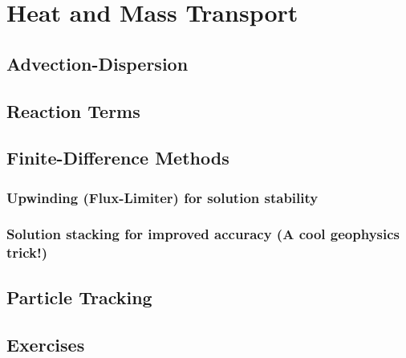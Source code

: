 \section{Heat and Mass Transport}
\subsection{Advection-Dispersion}
\subsection{Reaction Terms}
\subsection{Finite-Difference Methods}
\subsubsection{Upwinding (Flux-Limiter) for solution stability}
\subsubsection{Solution stacking for improved accuracy (A cool geophysics trick!)}
\subsection{Particle Tracking}
\subsection{Exercises}
